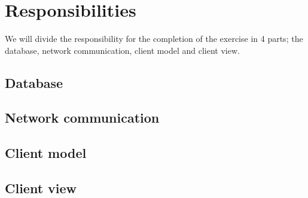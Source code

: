 \documentclass[a4paper, english, 12pt]{article}
\begin{document}
\section{Responsibilities}
We will divide the responsibility for the completion of the exercise in 4 parts; the database, network communication, 
client model and client view. 
\subsection{Database}

\subsection{Network communication}

\subsection{Client model}

\subsection{Client view}
\end{document}
